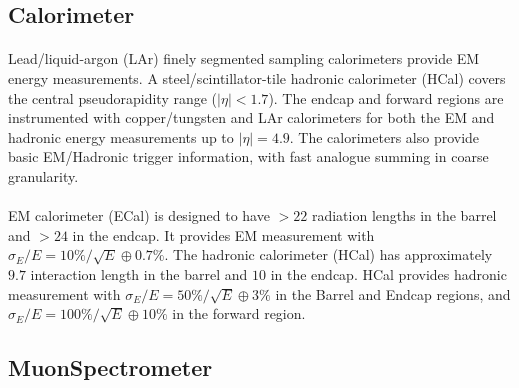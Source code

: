 \subsection{Calorimeter}
\paragraph{}
Lead/liquid-argon (LAr) finely segmented sampling calorimeters provide EM energy measurements. 
A steel/scintillator-tile hadronic calorimeter (HCal) covers the central pseudorapidity range ($|\eta| < 1.7$).
The endcap and forward regions are instrumented with copper/tungsten and LAr calorimeters for both the EM and hadronic energy measurements up to $|\eta| = 4.9$. The calorimeters also provide basic EM/Hadronic trigger information, with fast analogue summing in coarse granularity.
\paragraph{}
EM calorimeter (ECal) is designed to have $>22$ radiation lengths in the barrel and $> 24$ in the endcap. It provides EM measurement with $\sigma_E/E = 10\%/\sqrt{E} \oplus 0.7\%$. The hadronic calorimeter (HCal) has approximately $9.7$ interaction length in the barrel and $10$ in the endcap. HCal provides hadronic measurement with $\sigma_E/E = 50\%/\sqrt{E} \oplus 3\%$ in the Barrel and Endcap regions, and $\sigma_E/E = 100\%/\sqrt{E} \oplus 10\%$  in the forward region.
\subsection{MuonSpectrometer}

